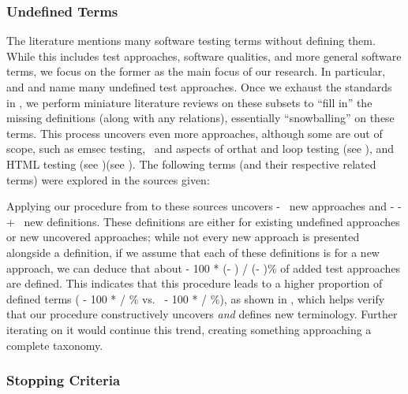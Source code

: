 \subsubsection{Undefined Terms}\label{undef-terms}

The literature mentions many software testing terms without defining them.
While this includes test approaches, software qualities, and more general
software terms, we focus on the former as the main focus of our research.
In particular, \ifnotpaper \citet{IEEE2022} and \citet{Firesmith2015} \else
    \cite{Firesmith2015} and \cite{IEEE2022} \fi name many undefined test
approaches. Once we exhaust the standards in , we
perform miniature literature reviews on these subsets to ``fill in'' the
missing definitions (along with any relations), essentially ``snowballing''
on these terms. This process uncovers even more approaches, although some are
out of scope, such as \acf{emsec} testing\ifnotpaper, \else\ and \fi
aspects of \acf{orthat} \ifnotpaper and loop testing (see ),
    and HTML testing (see )\else (see )\fi. The
following terms (and their respective related terms) were explored in the
sources given:


\label{iter-undef}
Applying our procedure from  to these sources uncovers
\the\numexpr \TotalAfter - \TotalBefore\relax\ new approaches and
\the\numexpr \TotalAfter - \UndefAfter - \TotalBefore + \UndefBefore\relax\ new
definitions. These definitions are either for existing undefined approaches or
new uncovered approaches; while not every new approach is presented alongside
a definition, if we assume that each of these definitions is for a new approach,
we can deduce that about \the{} - 100 * (\UndefAfter - \UndefBefore) /
(\TotalAfter - \TotalBefore)\relax\% of added test approaches are defined. This
indicates that this procedure leads to a higher proportion of defined terms
(\the{} - 100 * \UndefBefore / \TotalBefore\relax\% vs.~%
\the{} - 100 * \UndefAfter / \TotalAfter\relax\%), as shown in
, which helps verify that our procedure constructively
uncovers \emph{and} defines new terminology. Further iterating on it would
continue this trend, creating something approaching a complete taxonomy.

\ifnotpaper
    
\fi

\subsubsection{Stopping Criteria}\label{stop-crit}

